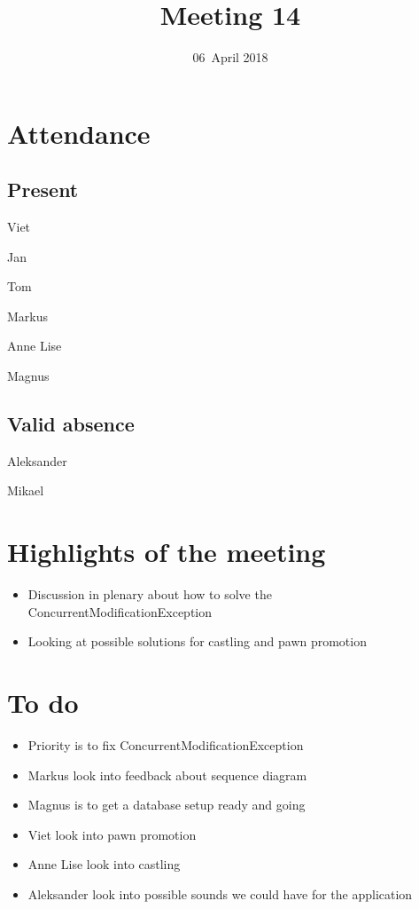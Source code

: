 \documentclass[letterpaper,11pt]{article}
\title{Meeting 14}
\date{06~April 2018}
\begin{document}
\maketitle
\section*{Attendance}
\subsection*{Present}
\begin{list}{}{}
	\item Viet
	\item Jan
	\item Tom
	\item Markus
	\item Anne Lise
	\item Magnus
\end{list}

\subsection*{Valid absence}
\begin{list}{}{}
	\item Aleksander
	\item Mikael
\end{list}

\newpage
\section*{Highlights of the meeting}
\begin{itemize}
	\item Discussion in plenary about how to solve the ConcurrentModificationException
	\item Looking at possible solutions for castling and pawn promotion
\end{itemize}

\section*{To do}
\begin{itemize}
	\item Priority is to fix ConcurrentModificationException
	\item Markus look into feedback about sequence diagram
	\item Magnus is to get a database setup ready and going
	\item Viet look into pawn promotion
	\item Anne Lise look into castling
	\item Aleksander look into possible sounds we could have for the application
\end{itemize}
\end{document}
